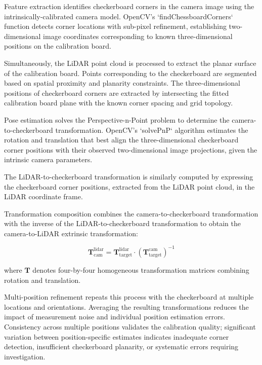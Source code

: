 Feature extraction identifies checkerboard corners in the camera image using the intrinsically-calibrated camera model.
OpenCV's `findChessboardCorners` function detects corner locations with sub-pixel refinement, establishing two-dimensional image coordinates corresponding to known three-dimensional positions on the calibration board.

Simultaneously, the LiDAR point cloud is processed to extract the planar surface of the calibration board.
Points corresponding to the checkerboard are segmented based on spatial proximity and planarity constraints.
The three-dimensional positions of checkerboard corners are extracted by intersecting the fitted calibration board plane with the known corner spacing and grid topology.

Pose estimation solves the Perspective-n-Point problem to determine the camera-to-checkerboard transformation.
OpenCV's `solvePnP` algorithm estimates the rotation and translation that best align the three-dimensional checkerboard corner positions with their observed two-dimensional image projections, given the intrinsic camera parameters.

The LiDAR-to-checkerboard transformation is similarly computed by expressing the checkerboard corner positions, extracted from the LiDAR point cloud, in the LiDAR coordinate frame.

Transformation composition combines the camera-to-checkerboard transformation with the inverse of the LiDAR-to-checkerboard transformation to obtain the camera-to-LiDAR extrinsic transformation:

\begin{equation}
    \mathbf{T}_{\text{cam}}^{\text{lidar}} = \mathbf{T}_{\text{target}}^{\text{lidar}} \cdot \left(\mathbf{T}_{\text{target}}^{\text{cam}}\right)^{-1}    
\end{equation}

where $\mathbf{T}$ denotes four-by-four homogeneous transformation matrices combining rotation and translation.

Multi-position refinement repeats this process with the checkerboard at multiple locations and orientations.
Averaging the resulting transformations reduces the impact of measurement noise and individual position estimation errors.
Consistency across multiple positions validates the calibration quality; significant variation between position-specific estimates indicates inadequate corner detection, insufficient checkerboard planarity, or systematic errors requiring investigation.

